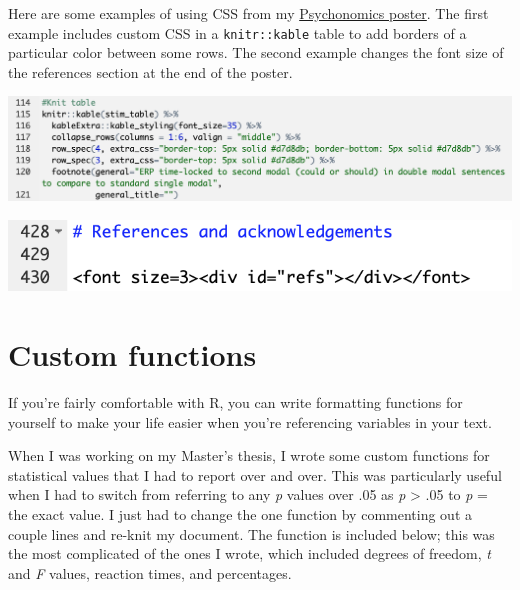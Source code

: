 \documentclass[
  openany]{book}
\begin{document}
Here are some examples of using CSS from my \href{https://github.com/hollzzar/psychonomics-poster/blob/master/Psychonomics.Rmd}{Psychonomics poster}. The first example includes custom CSS in a \texttt{knitr::kable} table to add borders of a particular color between some rows. The second example changes the font size of the references section at the end of the poster.

\includegraphics[width=\textwidth]{images/css_example}

\includegraphics[width=\textwidth]{images/html_example}

\hypertarget{help}{%
\section{Custom functions}\label{help}}

If you're fairly comfortable with R, you can write formatting functions for yourself to make your life easier when you're referencing variables in your text.

When I was working on my Master's thesis, I wrote some custom functions for statistical values that I had to report over and over. This was particularly useful when I had to switch from referring to any \emph{p} values over .05 as \emph{p} \textgreater{} .05 to \emph{p} = the exact value. I just had to change the one function by commenting out a couple lines and re-knit my document. The function is included below; this was the most complicated of the ones I wrote, which included degrees of freedom, \emph{t} and \emph{F} values, reaction times, and percentages.
\end{document}
